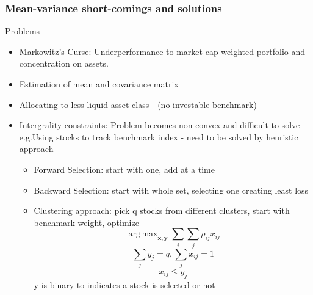 \documentclass[11pt, openany]{book}              %
\DeclareMathOperator*{\argmax}{arg\,max}  %
\begin{document}
\subsubsection{Mean-variance short-comings and solutions}

Problems
\begin{itemize}
	\item Markowitz's Curse: Underperformance to market-cap weighted portfolio and concentration on assets.
	\item Estimation of mean and covariance matrix
	\item  Allocating to less liquid asset class - (no investable benchmark)
	\item Intergrality constraints: Problem becomes non-convex and difficult to solve
		\subitem e.g.Using stocks to track benchmark index - need to be solved by heuristic approach
		\begin{itemize}
			\item Forward Selection: start with one, add at a time
			\item Backward Selection: start with whole set, selecting one creating least loss
			\item Clustering approach: pick q stocks from different clusters, start with benchmark weight, optimize
			$$ \argmax _{\mathbf{x,y}} \sum_i \sum_j \rho_{ij} x_{ij}$$
			$$ \sum_j y_j = q, \sum_j x_{ij} = 1$$
			$$ x_{ij} \leq y_j $$ y is binary to indicates a stock is selected or not
		\end{itemize}
\end{itemize}
\end{document}

